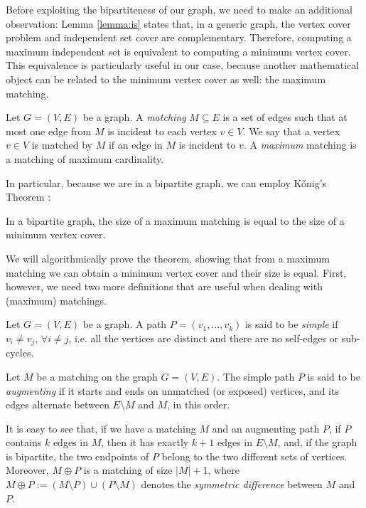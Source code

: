 Before exploiting the bipartiteness of our graph, we need to make an additional observation: Lemma \ref{lemma:is} states that, in a generic graph, the vertex cover problem and independent set cover are complementary. Therefore, computing a maximum independent set is equivalent to computing a minimum vertex cover. This equivalence is particularly useful in our case, because another mathematical object can be related to the minimum vertex cover as well: the maximum matching.

\begin{definition}[Matching]
	Let $G=(V,E)$ be a graph. A \emph{matching} $M \subseteq E$ is a set of edges such that at most one edge from $M$ is incident to each vertex $v \in V$. We say that a vertex $v \in V$ is matched by $M$ if an edge in $M$ is incident to $v$. A \emph{maximum} matching is a matching of maximum cardinality.
\end{definition}

In particular, because we are in a bipartite graph, we can employ K\H{o}nig's Theorem \cite{konig}:

\begin{theorem}[K\H{o}nig]
In a bipartite graph, the size of a maximum matching is equal to the size of a minimum vertex cover. \label{th:konig}
\end{theorem}

We will algorithmically prove the theorem, showing that from a maximum matching we can obtain a minimum vertex cover and their size is equal. First, however, we need two more definitions that are useful when dealing with (maximum) matchings.

\begin{definition}
	Let $G=(V,E)$ be a graph. A path $P=(v_1,\dots,v_k)$ is said to be \emph{simple} if $v_i \neq v_j$, $\forall i \neq j$, i.e. all the vertices are distinct and there are no self-edges or sub-cycles. \label{def:simple_path} 
\end{definition}

\begin{definition}
	Let $M$ be a matching on the graph $G=(V,E)$. The simple path $P$ is said to be \emph{augmenting} if it starts and ends on unmatched (or exposed) vertices, and its edges alternate between $E \setminus M$ and $M$, in this order.\label{def:augmenting_path}
\end{definition}

It is easy to see that, if we have a matching $M$ and an augmenting path $P$, if $P$ contains $k$ edges in $M$, then it has exactly $k+1$ edges in $E\setminus M$, and, if the graph is bipartite, the two endpoints of $P$ belong to the two different sets of vertices. Moreover, $M \oplus P$ is a matching of size $|M|+1$, where $M \oplus P := (M \setminus P) \cup (P \setminus M)$ denotes the \emph{symmetric difference} between $M$ and $P$. 

